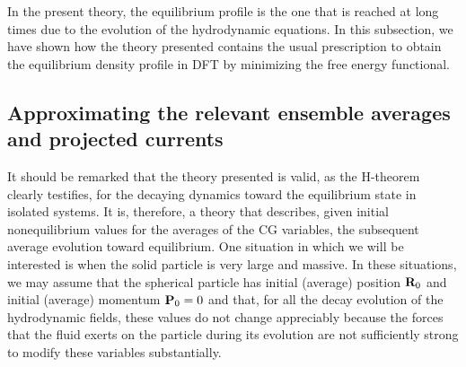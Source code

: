 \documentclass[b5paper,openright,10pt]{book}
\begin{document}
In the  present theory,  the equilibrium  profile is  the one  that is
reached  at  long times  due  to  the  evolution of  the  hydrodynamic
equations.  In this subsection, we have shown how the theory presented
contains  the usual  prescription  to obtain  the equilibrium  density
profile in  DFT by minimizing the  free energy
functional.

\subsection{Approximating the relevant ensemble averages and projected
  currents}
It  should be  remarked that  the theory  presented is  valid, as  the
H-theorem  clearly testifies,  for the  decaying dynamics  toward the
equilibrium state in isolated systems. It is, therefore, a theory that
describes, given initial nonequilibrium values for  the averages of the CG variables,
the subsequent  average evolution toward equilibrium.   One situation
in which  we will  be interested  is when the  solid particle  is very
large and  massive.  In these situations, we may assume
that the spherical particle has initial (average) position ${\bf R}_0$
and initial  (average) momentum  ${\bf P}_0=0$ and  that, for  all the
decay evolution of the hydrodynamic fields, these values do not change
appreciably because the  forces that the fluid exerts  on the particle
during  its evolution  are  not sufficiently  strong  to modify  these
variables substantially.
\end{document}

